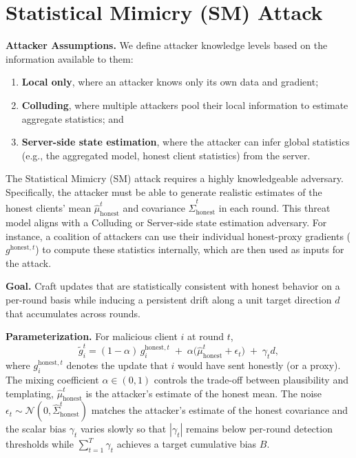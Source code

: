 \documentclass[lettersize,journal]{IEEEtran}
\begin{document}


\section{Statistical Mimicry (SM) Attack}
\label{sec:sm_attack}

\textbf{Attacker Assumptions.}
We define attacker knowledge levels based on the information available to them: 
\begin{enumerate}
    \item \textbf{Local only}, where an attacker knows only its own data and gradient; 
    \item \textbf{Colluding}, where multiple attackers pool their local information to estimate aggregate statistics; and 
    \item \textbf{Server-side state estimation}, where the attacker can infer global statistics (e.g., the aggregated model, honest client statistics) from the server.
\end{enumerate}
The Statistical Mimicry (SM) attack requires a highly knowledgeable adversary. Specifically, the attacker must be able to generate realistic estimates of the honest clients' mean $\hat{\mu}_{\mathrm{honest}}^t$ and covariance $\hat{\Sigma}_{\mathrm{honest}}^t$ in each round. This threat model aligns with a Colluding or Server-side state estimation adversary. For instance, a coalition of attackers can use their individual honest-proxy gradients ($g^{\mathrm{honest},t}$) to compute these statistics internally, which are then used as inputs for the attack.

\textbf{Goal.} Craft updates that are statistically consistent with honest behavior on a per-round basis while inducing a persistent drift along a unit target direction $d$ that accumulates across rounds.

\textbf{Parameterization.} For malicious client $i$ at round $t$,
\[
\tilde{g}_i^t=(1-\alpha)\,g_i^{\mathrm{honest},t} \;+\; \alpha\big(\hat{\mu}_{\mathrm{honest}}^t+\epsilon_t\big) \;+\; \gamma_t d,
\]
where $g_i^{\mathrm{honest},t}$ denotes the update that $i$ would have sent honestly (or a proxy). The mixing coefficient $\alpha\in(0,1)$ controls the trade-off between plausibility and templating, $\hat{\mu}_{\mathrm{honest}}^t$ is the attacker's estimate of the honest mean. The noise $\epsilon_t\sim\mathcal{N}(0,\hat{\Sigma}_{\mathrm{honest}}^t)$ matches the attacker's estimate of the honest covariance and the scalar bias $\gamma_t$ varies slowly so that $|\gamma_t|$ remains below per-round detection thresholds while $\sum_{t=1}^T\gamma_t$ achieves a target cumulative bias $B$.
\end{document}
